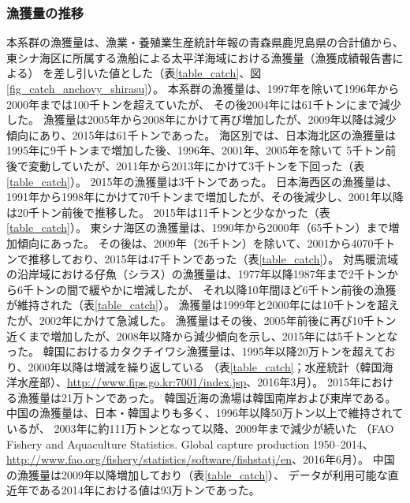 \subsubsection{漁獲量の推移}
本系群の漁獲量は、漁業・養殖業生産統計年報の青森県鹿児島県の合計値から、
東シナ海区に所属する漁船による太平洋海域における漁獲量（漁獲成績報告書による）
を差し引いた値とした（表\ref{table_catch}、図\ref{fig_catch_anchovy_shirasu}）。
本系群の漁獲量は、1997年を除いて1996年から2000年までは100千トンを超えていたが、
その後2004年には61千トンにまで減少した。
漁獲量は2005年から2008年にかけて再び増加したが、2009年以降は減少傾向にあり、2015年は61千トンであった。
%
%
 海区別では、日本海北区の漁獲量は1995年に9千トンまで増加した後、1996年、2001年、2005年を除いて
 5千トン前後で変動していたが、2011年から2013年にかけて3千トンを下回った（表\ref{table_catch}）。
 2015年の漁獲量は3千トンであった。
日本海西区の漁獲量は、1991年から1998年にかけて70千トンまで増加したが、その後減少し、2001年以降は20千トン前後で推移した。
2015年は11千トンと少なかった（表\ref{table_catch}）。
東シナ海区の漁獲量は、1990年から2000年（65千トン）まで増加傾向にあった。
その後は、2009年（26千トン）を除いて、2001から4070千トンで推移しており、2015年は47千トンであった（表\ref{table_catch}）。
%
%
対馬暖流域の沿岸域における仔魚（シラス）の漁獲量は、1977年以降1987年まで2千トンから6千トンの間で緩やかに増減したが、
それ以降10年間ほど6千トン前後の漁獲が維持された（表\ref{table_catch}）。
漁獲量は1999年と2000年には10千トンを超えたが、2002年にかけて急減した。
漁獲量はその後、2005年前後に再び10千トン近くまで増加したが、2008年以降から減少傾向を示し、2015年には5千トンとなった。
%
%
韓国におけるカタクチイワシ漁獲量は、1995年以降20万トンを超えており、2000年以降は増減を繰り返している
（表\ref{table_catch}；水産統計（韓国海洋水産部）、\url{http://www.fips.go.kr:7001/index.jsp}、2016年3月）。
2015年における漁獲量は21万トンであった。
韓国近海の漁場は韓国南岸および東岸である\citep{Korfish2000}。
%
%
中国の漁獲量は、日本・韓国よりも多く、1996年以降50万トン以上で維持されているが、
2003年に約111万トンとなって以降、2009年まで減少が続いた
（FAO Fishery and Aquaculture Statistics. Global capture production 1950--2014、
\url{http://www.fao.org/fishery/statistics/software/fishstatj/en}、2016年6月）。
中国の漁獲量は2009年以降増加しており（表\ref{table_catch}）、
データが利用可能な直近年である2014年における値は93万トンであった。
